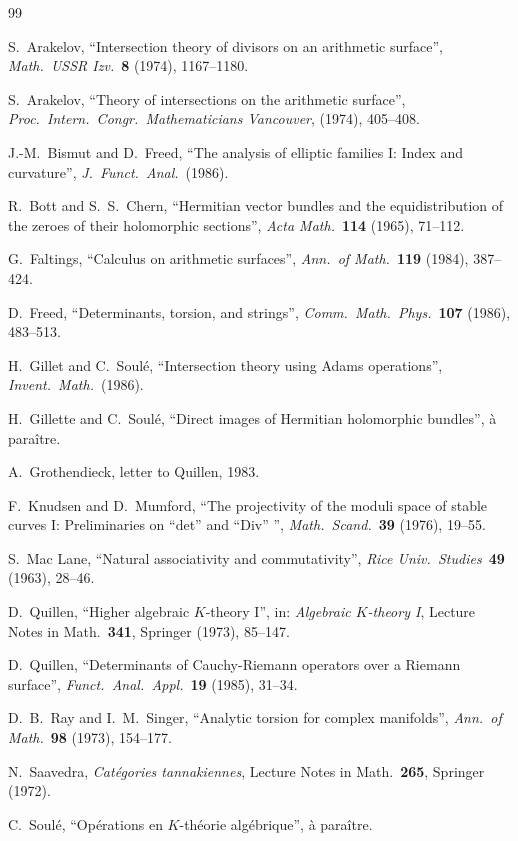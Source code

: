\documentclass[12pt,a4paper]{article}
\theoremstyle{plain}
\theoremstyle{definition}
\begin{document}
\begin{thebibliography}{99}

 S.~Arakelov, ``Intersection theory of divisors on an arithmetic surface'', \textit{Math.\ USSR Izv.}\ \textbf{8} (1974), 1167--1180.

 S.~Arakelov, ``Theory of intersections on the arithmetic surface'', \textit{Proc.\ Intern.\ Congr.\ Mathematicians Vancouver}, (1974), 405--408.

 J.-M.~Bismut and D.~Freed, ``The analysis of elliptic families I: Index and curvature'', \textit{J.\ Funct.\ Anal.}\ (1986).

 R.~Bott and S.~S.~Chern, ``Hermitian vector bundles and the equidistribution of the zeroes of their holomorphic sections'', \textit{Acta Math.}\ \textbf{114} (1965), 71--112.

 G.~Faltings, ``Calculus on arithmetic surfaces'', \textit{Ann.\ of Math.}\ \textbf{119} (1984), 387--424.

 D.~Freed, ``Determinants, torsion, and strings'', \textit{Comm.\ Math.\ Phys.}\ \textbf{107} (1986), 483--513.

 H.~Gillet and C.~Soul\'e, ``Intersection theory using Adams operations'', \textit{Invent.\ Math.}\ (1986).

 H.~Gillette and C.~Soul\'e, ``Direct images of Hermitian holomorphic bundles'', \`a para\^itre.

 A.~Grothendieck, letter to Quillen, 1983.

 F.~Knudsen and D.~Mumford, ``The projectivity of the moduli space of stable curves I: Preliminaries on ``det'' and ``Div'' '', \textit{Math.\ Scand.}\ \textbf{39} (1976), 19--55.

 S.~Mac Lane, ``Natural associativity and commutativity'', \textit{Rice Univ.\ Studies}\ \textbf{49} (1963), 28--46.

 D.~Quillen, ``Higher algebraic $K$-theory I'', in: \textit{Algebraic $K$-theory I}, Lecture Notes in Math.\ \textbf{341}, Springer (1973), 85--147.

 D.~Quillen, ``Determinants of Cauchy-Riemann operators over a Riemann surface'', \textit{Funct.\ Anal.\ Appl.}\ \textbf{19} (1985), 31--34.

 D.~B.~Ray and I.~M.~Singer, ``Analytic torsion for complex manifolds'', \textit{Ann.\ of Math.}\ \textbf{98} (1973), 154--177.

 N.~Saavedra, \textit{Cat\'egories tannakiennes}, Lecture Notes in Math.\ \textbf{265}, Springer (1972).

 C.~Soul\'e, ``Op\'erations en $K$-th\'eorie alg\'ebrique'', \`a para\^itre.

\end{thebibliography}
\end{document}
